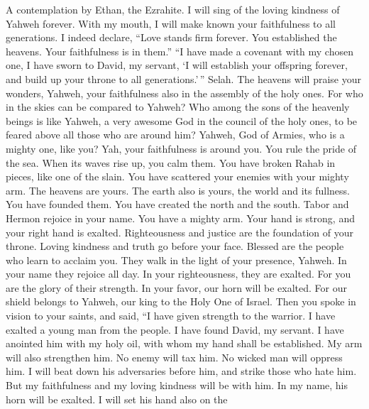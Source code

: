 A contemplation by Ethan, the Ezrahite.  I will sing of
the loving kindness of Yahweh forever. With my mouth, I will make known
your faithfulness to all generations.  I indeed declare,
``Love stands firm forever. You established the heavens. Your
faithfulness is in them.''  ``I have made a covenant with
my chosen one, I have sworn to David, my servant,  `I will
establish your offspring forever, and build up your throne to all
generations.'\,'' Selah.  The heavens will praise your
wonders, Yahweh, your faithfulness also in the assembly of the holy
ones.  For who in the skies can be compared to Yahweh? Who
among the sons of the heavenly beings is like Yahweh,  a
very awesome God in the council of the holy ones, to be feared above all
those who are around him?  Yahweh, God of Armies, who is a
mighty one, like you? Yah, your faithfulness is around you.
 You rule the pride of the sea. When its waves rise up,
you calm them.  You have broken Rahab in pieces, like one
of the slain. You have scattered your enemies with your mighty arm.
 The heavens are yours. The earth also is yours, the
world and its fullness. You have founded them.  You have
created the north and the south. Tabor and Hermon rejoice in your name.
 You have a mighty arm. Your hand is strong, and your
right hand is exalted.  Righteousness and justice are the
foundation of your throne. Loving kindness and truth go before your
face.  Blessed are the people who learn to acclaim you.
They walk in the light of your presence, Yahweh.  In your
name they rejoice all day. In your righteousness, they are exalted.
 For you are the glory of their strength. In your favor,
our horn will be exalted.  For our shield belongs to
Yahweh, our king to the Holy One of Israel.  Then you
spoke in vision to your saints, and said, ``I have given strength to the
warrior. I have exalted a young man from the people.  I
have found David, my servant. I have anointed him with my holy oil,
 with whom my hand shall be established. My arm will also
strengthen him.  No enemy will tax him. No wicked man
will oppress him.  I will beat down his adversaries
before him, and strike those who hate him.  But my
faithfulness and my loving kindness will be with him. In my name, his
horn will be exalted.  I will set his hand also on the
